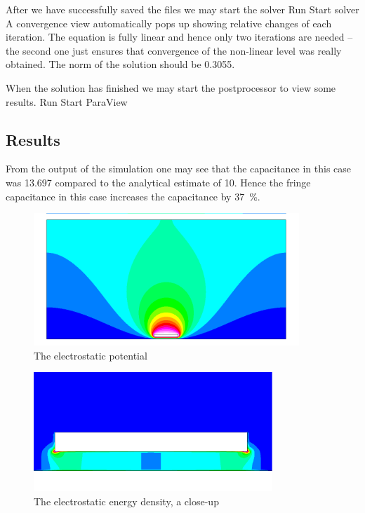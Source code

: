 After we have successfully saved the files we may start the solver
\ttbegin
Run
  Start solver
\ttend
A convergence view automatically pops up showing relative changes of each iteration.
The equation is fully linear and hence only two iterations are needed -- the second 
one just ensures that convergence of the non-linear level was really obtained. 
The norm of the solution should be 0.3055.

When the solution has finished we may start the postprocessor to view some results.
\ttbegin
Run
  Start ParaView
\ttend


\subsection*{Results}

From the output of the simulation one may see that the 
capacitance in this case was 13.697 compared to the analytical estimate of 10. 
Hence the fringe capacitance in this case increases the capacitance by 37~\%. 

\begin{figure}[h]
\centering
\includegraphics[width=10cm, viewport=0 20 1024 480,clip]{potential}
\caption{The electrostatic potential}\label{fg:es_potential}
\end{figure} 

\begin{figure}[h]
\centering
\includegraphics[width=9cm, viewport=0 20 1024 480,clip]{energy}
\caption{The electrostatic energy density, a close-up}\label{fg:es_energy}
\end{figure} 


\hfill

